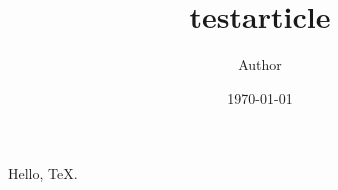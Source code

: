 \documentclass{article}
\title{testarticle}
\author{Author}
\date{\today}
\begin{document}
\maketitle
Hello, TeX.
\end{document}
